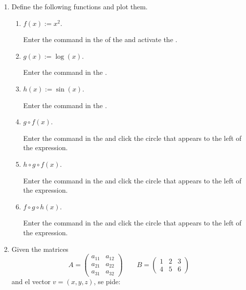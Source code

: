 \begin{enumerate}
\item Define the following functions and plot them.
      \begin{enumerate}
      \item $f(x):=x^2$.
            \begin{indication}
            Enter the command  in the  of the  and activate the .
            \end{indication}
      \item $g(x):=\log(x)$.
            \begin{indication}
            Enter the command  in the .
            \end{indication}
      \item $h(x):=\sin(x)$.
            \begin{indication}
            Enter the command  in the .
            \end{indication}
      \item $g\circ f(x)$.
            \begin{indication}
            Enter the command  in the  and click the circle that appears to the left of the expression.
            \end{indication}
      \item $h\circ g \circ f(x)$.
            \begin{indication}
            Enter the command  in the  and click the circle that appears to the left of the expression.
            \end{indication}
      \item $f\circ g \circ h(x)$.
            \begin{indication}
            Enter the command  in the  and click the circle that appears to the left of the expression.
            \end{indication}
      \end{enumerate}

\item Given the matrices
      \[
      A=\left(
      \begin{array}{cc}
      a_{11} & a_{12} \\
      a_{21} & a_{22} \\
      a_{31} & a_{32}
      \end{array}
      \right)
      \qquad
      B=\left(
      \begin{array}{ccc}
      1 & 2 & 3 \\
      4 & 5 & 6
      \end{array}
      \right)
      \]
      and el vector $v=(x, y, z)$, se pide:


\end{enumerate}
